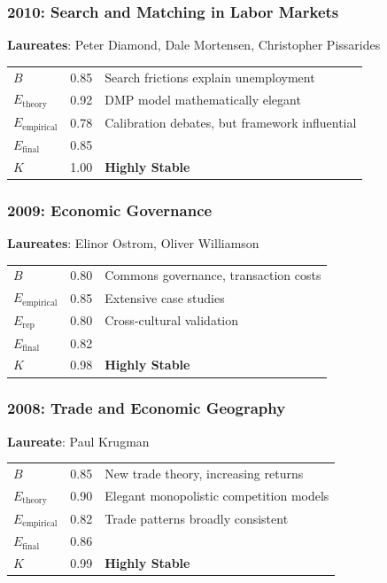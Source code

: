 \documentclass[11pt,a4paper]{article}
\begin{document}
\subsubsection{2010: Search and Matching in Labor Markets}
\textbf{Laureates}: Peter Diamond, Dale Mortensen, Christopher Pissarides

\begin{center}
\begin{tabular}{lcl}
\toprule
$B$ & 0.85 & Search frictions explain unemployment \\
$E_{\text{theory}}$ & 0.92 & DMP model mathematically elegant \\
$E_{\text{empirical}}$ & 0.78 & Calibration debates, but framework influential \\
\midrule
$E_{\text{final}}$ & 0.85 & \\
$K$ & 1.00 & \textbf{Highly Stable} \\
\bottomrule
\end{tabular}
\end{center}

\subsubsection{2009: Economic Governance}
\textbf{Laureates}: Elinor Ostrom, Oliver Williamson

\begin{center}
\begin{tabular}{lcl}
\toprule
$B$ & 0.80 & Commons governance, transaction costs \\
$E_{\text{empirical}}$ & 0.85 & Extensive case studies \\
$E_{\text{rep}}$ & 0.80 & Cross-cultural validation \\
\midrule
$E_{\text{final}}$ & 0.82 & \\
$K$ & 0.98 & \textbf{Highly Stable} \\
\bottomrule
\end{tabular}
\end{center}

\subsubsection{2008: Trade and Economic Geography}
\textbf{Laureate}: Paul Krugman

\begin{center}
\begin{tabular}{lcl}
\toprule
$B$ & 0.85 & New trade theory, increasing returns \\
$E_{\text{theory}}$ & 0.90 & Elegant monopolistic competition models \\
$E_{\text{empirical}}$ & 0.82 & Trade patterns broadly consistent \\
\midrule
$E_{\text{final}}$ & 0.86 & \\
$K$ & 0.99 & \textbf{Highly Stable} \\
\bottomrule
\end{tabular}
\end{center}
\end{document}
